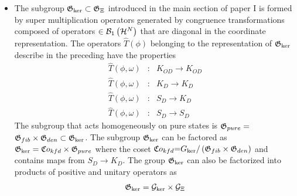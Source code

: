 \begin{itemize}
\item The subgroup ${\frak G}_{\ker }\subset {\frak G}_{\Xi }$ introduced in
the main section of paper I is formed by super multiplication operators
generated by congruence transformations composed of operators $\in {\cal B}%
_{1}\left( {\cal H}^{N}\right) $ that are diagonal in the coordinate
representation. The operators $\hat{T}\left( \phi \right) $ belonging to the
representation of ${\frak G}_{\ker }$ describe in the preceding have the
properties 
\begin{eqnarray}
\hat{T}\left( \phi ,\omega \right) &:&K_{OD}\rightarrow K_{OD}  \nonumber \\
\hat{T}\left( \phi ,\omega \right) &:&K_{D}\rightarrow K_{D}  \nonumber \\
\hat{T}\left( \phi ,\omega \right) &:&S_{D}\rightarrow K_{D}  \nonumber \\
\hat{T}\left( \phi ,\omega \right) &:&S_{D}\rightarrow S_{D}
\end{eqnarray}%
The subgroup that acts homogeneously on pure states is ${\frak G}_{pure}=$ $%
{\frak G}_{fib}\times {\frak G}_{den}\subset {\frak G}_{\ker }$. The
subgroup ${\frak G}_{\ker }$ can be factored as ${\frak G}_{\ker }={\frak Co}%
_{kfd}\times {\frak G}_{pure}$ where the coset ${\frak Co}_{kfd}{\frak =G}%
_{\ker }/\left( {\frak G}_{fib}\times {\frak G}_{den}\right) $ and contains
maps from $S_{D}\rightarrow K_{D}$. The group ${\frak G}_{\ker }$ can also
be factorized into products of positive and unitary operators as 
\begin{equation}
{\frak G}_{\ker }={\cal G}_{\ker }\times {\cal G}_{\Xi }
\end{equation}


\end{itemize}
